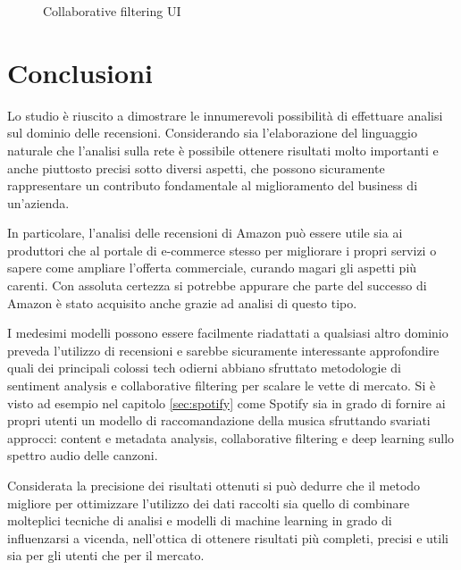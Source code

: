 \documentclass[hidelinks, 12pt]{article}
\begin{document}
\begin{figure}[H]
	\centering
	\caption[Collaborative filtering UI]{Collaborative filtering UI}
	\label{fig:collaborative_filtering_ui}
\end{figure}



\clearpage



\section{Conclusioni}

Lo studio è riuscito a dimostrare le innumerevoli possibilità di effettuare analisi sul dominio delle recensioni. Considerando sia l'elaborazione del linguaggio naturale che l'analisi sulla rete è possibile ottenere risultati molto importanti e anche piuttosto precisi sotto diversi aspetti, che possono sicuramente rappresentare un contributo fondamentale al miglioramento del business di un'azienda.

In particolare, l'analisi delle recensioni di Amazon può essere utile sia ai produttori che al portale di e-commerce stesso per migliorare i propri servizi o sapere come ampliare l'offerta commerciale, curando magari gli aspetti più carenti. Con assoluta certezza si potrebbe appurare che parte del successo di Amazon è stato acquisito anche grazie ad analisi di questo tipo.

I medesimi modelli possono essere facilmente riadattati a qualsiasi altro dominio preveda l'utilizzo di recensioni e sarebbe sicuramente interessante approfondire quali dei principali colossi tech odierni abbiano sfruttato metodologie di sentiment analysis e collaborative filtering per scalare le vette di mercato. Si è visto ad esempio nel capitolo \ref{sec:spotify} come Spotify sia in grado di fornire ai propri utenti un modello di raccomandazione della musica sfruttando svariati approcci: content e metadata analysis, collaborative filtering e deep learning sullo spettro audio delle canzoni.

Considerata la precisione dei risultati ottenuti si può dedurre che il metodo migliore per ottimizzare l'utilizzo dei dati raccolti sia quello di combinare molteplici tecniche di analisi e modelli di machine learning in grado di influenzarsi a vicenda, nell'ottica di ottenere risultati più completi, precisi e utili sia per gli utenti che per il mercato.





\newpage


	
\end{document}
